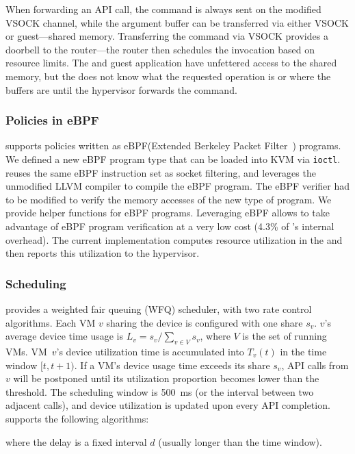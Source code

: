 When forwarding an API call, the command is always sent on the modified VSOCK
channel, while the argument buffer can be transferred via either VSOCK or
guest---\worker shared memory. Transferring the command via VSOCK provides a
doorbell to the router---the router then schedules the invocation based on
resource limits. The \worker and guest application have unfettered access to
the shared memory, but the \worker does not know what the requested operation
is or where the buffers are until the hypervisor forwards the command.

\subsubsection{Policies in eBPF}
\AvA supports policies written as eBPF(Extended Berkeley Packet
Filter~\cite{bpf}) programs. We defined a new eBPF program type that can be
loaded into KVM via \texttt{ioctl}. \AvA reuses the same eBPF instruction set
as socket filtering, and leverages the unmodified LLVM compiler to compile the
eBPF program. The eBPF verifier had to be modified to verify the memory
accesses of the new type of program. We provide helper functions for \AvA eBPF
programs. Leveraging eBPF allows \AvA to take advantage of eBPF program
verification at a very low cost (4.3\% of \AvA's internal overhead). The
current implementation computes resource utilization in the \worker and then
reports this utilization to the hypervisor.

\subsubsection{Scheduling}

\AvA provides a weighted fair queuing (WFQ) scheduler, with two rate control
algorithms. Each VM $v$ sharing the device is configured with one share $s_v$.
$v$'s average device time usage is $L_v=s_v/\sum_{v\in V} s_v$, where $V$ is the set of running VMs. VM~$v$'s device utilization time is accumulated into
$T_v(t)$ in the time window $[t, t+1)$. If a VM's device usage time exceeds its share $s_v$, API calls from $v$ will be postponed until its utilization proportion becomes lower than the threshold. The scheduling window is 500~ms (or the interval between two adjacent calls), and device utilization is updated upon every API completion. \AvA supports the following algorithms:

 where the delay is a fixed interval $d$ (usually longer than the time window).

